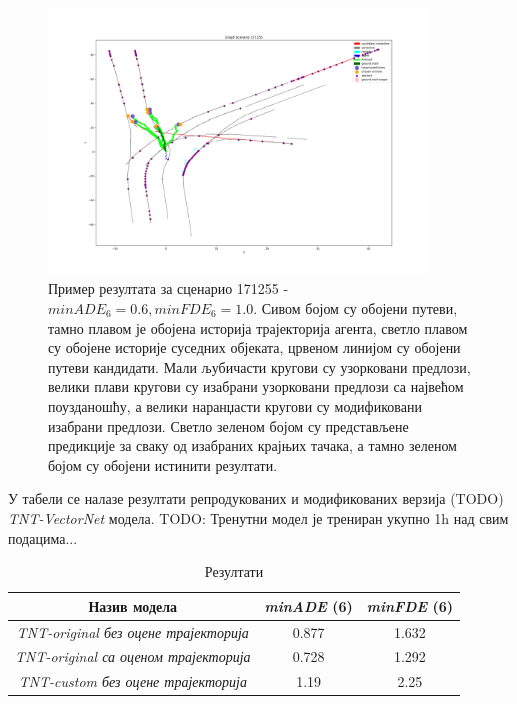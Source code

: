 \documentclass[11pt,oneside]{memoir}
\begin{document}
\begin{figure}[H]
  \centering
  \includegraphics[width=0.9\textwidth]{images/tnt-scenario-171255.png}
  \caption{
    Пример резултата за сценарио 171255 - $minADE_{6} = 0.6, minFDE_{6} = 1.0$. Сивом 
    бојом су обојени путеви, тамно плавом је обојена историја трајекторија агента, светло плавом су обојене историје суседних објеката,
    црвеном линијом су обојени путеви кандидати. Мали љубичасти кругови су узорковани предлози, велики плави кругови су изабрани
    узорковани предлози са највећом поузданошћу, а велики наранџасти кругови су модификовани изабрани предлози. Светло зеленом
    бојом су представљене предикције за сваку од изабраних крајњих тачака, а тамно зеленом бојом су обојени истинити резултати. 
    \label{tnt-scenario-171255}
  }
\end{figure}

У табели  се налазе резултати репродукованих и модификованих верзија (TODO) \textit{TNT-VectorNet} модела. TODO: Тренутни модел је трениран укупно 1h над свим подацима...

\begin{table}
  \begin{tabular}{c|c|c}
    Назив модела & \textit{minADE} (6) & \textit{minFDE} (6) \\
    \hline
    \textit{TNT-original без оцене трајекторија} & 0.877 & 1.632 \\
    \textit{TNT-original са оценом трајекторија} & 0.728 & 1.292 \\
    \textit{TNT-custom без оцене трајекторија}  & 1.19 & 2.25
  \end{tabular}
  \caption{Резултати}
  \label{vectornet-results}
\end{table}
\end{document}
